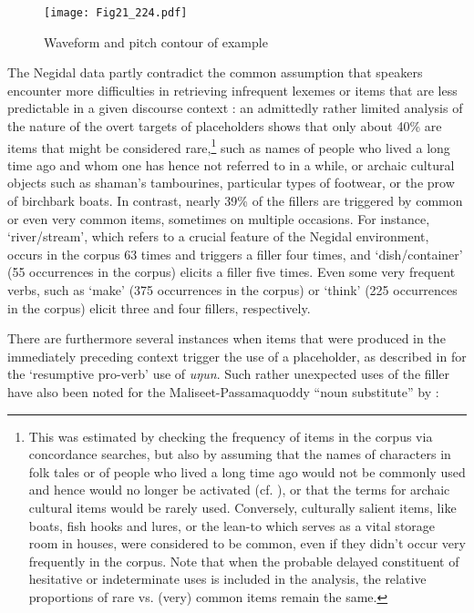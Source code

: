 \documentclass[output=paper]{langscibook}
\begin{document}
\begin{figure}
\texttt{[image: Fig21\_224.pdf]}
\caption{Waveform and pitch contour of example }
\label{fig:pakendorf:21}
\end{figure}

The Negidal data partly contradict the common assumption that speakers encounter more difficulties in retrieving infrequent lexemes or items that are less predictable in a given discourse context \citep[461--462]{Lickley2015}: an admittedly rather limited analysis of the nature of the overt targets of placeholders shows that only about 40\% are items that might be considered rare,\footnote{This was estimated by checking the frequency of items in the corpus via concordance searches, but also by assuming that the names of characters in folk tales or of people who lived a long time ago would not be commonly used and hence would no longer be activated (cf. \citealt[274]{Schegloff1979}), or that the terms for archaic cultural items would be rarely used. Conversely, culturally salient items, like boats, fish hooks and lures, or the lean-to which serves as a vital storage room in houses, were considered to be common, even if they didn’t occur very frequently in the corpus. Note that when the probable delayed constituent of hesitative or indeterminate uses is included in the analysis, the relative proportions of rare vs. (very) common items remain the same.} such as names of people who lived a long time ago and whom one has hence not referred to in a while, or archaic cultural objects such as shaman’s tambourines, particular types of footwear, or the prow of birchbark boats. In contrast, nearly 39\% of the fillers are triggered by common or even very common items, sometimes on multiple occasions. For instance, ‘river/stream’, which refers to a crucial feature of the Negidal environment, occurs in the corpus 63 times and triggers a filler four times, and ‘dish/container’ (55 occurrences in the corpus) elicits a filler five times. Even some very frequent verbs, such as ‘make’ (375 occurrences in the corpus) or ‘think’ (225 occurrences in the corpus) elicit three and four fillers, respectively.

There are furthermore several instances when items that were produced in the immediately preceding context trigger the use of a placeholder, as described in  for the ‘resumptive pro-verb’ use of \textit{uŋun}. Such rather unexpected uses of the filler have also been noted for the Maliseet\hyp Passamaquoddy “noun substitute” by \citet[142]{LeSourd2003}: 
\end{document}
